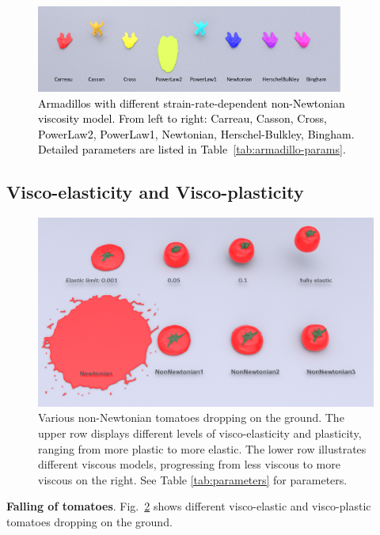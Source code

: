 \documentclass[10pt,journal,compsoc]{IEEEtran}
\newcommand{\revised}[1]{{\textcolor{black}{#1}}}
\begin{document}
\begin{figure}[htbp]
	\centering
	\includegraphics[width=0.9\textwidth]{pics/ramp.png}
	\caption{\revised{Armadillos with different strain-rate-dependent non-Newtonian viscosity model. From left to right: Carreau, Casson, Cross, PowerLaw2, PowerLaw1, Newtonian, Herschel-Bulkley, Bingham. Detailed parameters are listed in Table~\ref{tab:armadillo-params}.}}     \label{fig:ramp}
\end{figure}


\subsection{Visco-elasticity and Visco-plasticity}\label{sec.}



\begin{figure}[htbp]
	\centering
	\includegraphics[width=.95\linewidth]{pics/teaser.png}
	\caption{Various non-Newtonian tomatoes dropping on the ground. The upper row displays different levels of visco-elasticity and plasticity, ranging from more plastic to more elastic. The lower row illustrates different viscous models, progressing from less viscous to more viscous on the right. See Table \ref{tab:parameters} for parameters. }\label{fig:teaser}
\end{figure}



\textbf{Falling of tomatoes}.
Fig.~\ref{fig:teaser} shows different visco-elastic and visco-plastic tomatoes dropping on the ground.
\end{document}
